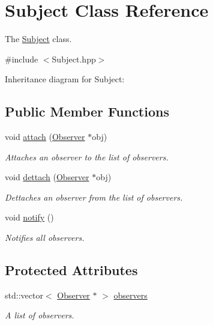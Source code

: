 \hypertarget{class_subject}{}\section{Subject Class Reference}
\label{class_subject}


The \hyperlink{class_subject}{Subject} class.  




{\ttfamily \#include $<$Subject.\+hpp$>$}



Inheritance diagram for Subject\+:
\subsection*{Public Member Functions}
\begin{DoxyCompactItemize}
\item 
void \hyperlink{class_subject_ac276c84c5d4fd6df3fb9025c131fa10d}{attach} (\hyperlink{class_observer}{Observer} $\ast$obj)
\begin{DoxyCompactList}\small\item\em Attaches an observer to the list of observers. \end{DoxyCompactList}\item 
void \hyperlink{class_subject_ad4959e3d82f295326fb003df4a38c522}{dettach} (\hyperlink{class_observer}{Observer} $\ast$obj)
\begin{DoxyCompactList}\small\item\em Dettaches an observer from the list of observers. \end{DoxyCompactList}\item 
\mbox{\label{class_subject_af104c2baf37c7aa63b2ef6d32c2b3a9c}} 
void \hyperlink{class_subject_af104c2baf37c7aa63b2ef6d32c2b3a9c}{notify} ()
\begin{DoxyCompactList}\small\item\em Notifies all observers. \end{DoxyCompactList}\end{DoxyCompactItemize}
\subsection*{Protected Attributes}
\begin{DoxyCompactItemize}
\item 
\mbox{\label{class_subject_ac55e8afa4f70788ead15a2eae70b5696}} 
std\+::vector$<$ \hyperlink{class_observer}{Observer} $\ast$ $>$ \hyperlink{class_subject_ac55e8afa4f70788ead15a2eae70b5696}{observers}
\begin{DoxyCompactList}\small\item\em A list of observers. \end{DoxyCompactList}\end{DoxyCompactItemize}


